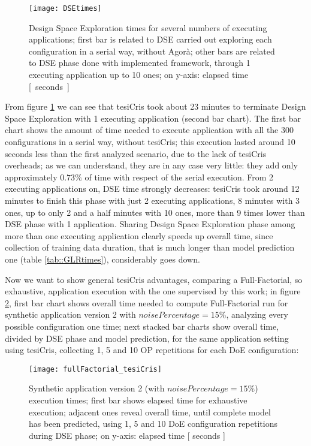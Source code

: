 \begin{figure}[H]

    \centering
    \texttt{[image: DSEtimes]}
    \caption{Design Space Exploration times for several numbers of executing applications; first bar is related to DSE carried out exploring each configuration in a serial way, without Agorà; other bars are related to DSE phase done with implemented framework, through 1 executing application up to 10 ones; on y-axis: elapsed time \hbox{[ seconds ]}}
    \label{fig::DSEtimes}
    
\end{figure}

From figure \ref{fig::DSEtimes} we can see that tesiCris took about 23 minutes to terminate Design Space Exploration with 1 executing application (second bar chart). The first bar chart shows the amount of time needed to execute application with all the 300 configurations in a serial way, without tesiCris; this execution lasted around 10 seconds less than the first analyzed scenario, due to the lack of tesiCris overheads; as we can understand, they are in any case very little: they add only approximately $0.73\%$ of time with respect of the serial execution. From 2 executing applications on, DSE time strongly decreases: tesiCris took around 12 minutes to finish this phase with just 2 executing applications, 8 minutes with 3 ones, up to only 2 and a half minutes with 10 ones, more than 9 times lower than DSE phase with 1 application. Sharing Design Space Exploration phase among more than one executing application clearly speeds up overall time, since collection of training data duration, that is much longer than model prediction one (table \ref{tab::GLRtimes}), considerably goes down.

Now we want to show general tesiCris advantages, comparing a Full-Factorial, so exhaustive, application execution with the one supervised by this work; in figure \ref{fig::full_cris}, first bar chart shows overall time needed to compute Full-Factorial run for synthetic application version 2 with $noisePercentage = 15\%$, analyzing every possible configuration one time; next stacked bar charts show overall time, divided by DSE phase and model prediction, for the same application setting using tesiCris, collecting 1, 5 and 10 OP repetitions for each DoE configuration:

\begin{figure}[H]

    \centering
    \texttt{[image: fullFactorial\_tesiCris]}
    \caption{Synthetic application version 2 (with $noisePercentage = 15\%$) execution times; first bar shows elapsed time for exhaustive execution; adjacent ones reveal overall time, until complete model has been predicted, using 1, 5 and 10 DoE configuration repetitions during DSE phase; on y-axis: elapsed time [ seconds ]}
    \label{fig::full_cris}
    
\end{figure}

